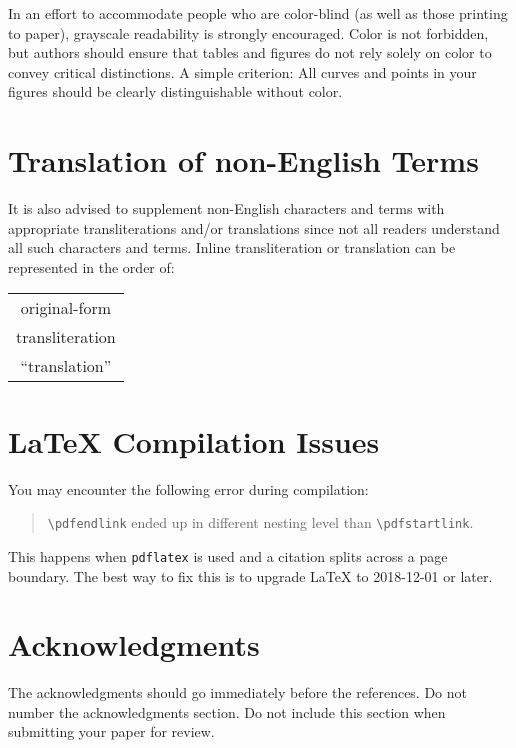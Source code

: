 \documentclass[11pt,a4paper]{article}
\begin{document}
In an effort to accommodate people who are color-blind (as well as those printing to paper), grayscale readability is strongly encouraged.
Color is not forbidden, but authors should ensure that tables and figures do not rely solely on color to convey critical distinctions.
A simple criterion:
All curves and points in your figures should be clearly distinguishable without color.

\section{Translation of non-English Terms}

It is also advised to supplement non-English characters and terms with appropriate transliterations and/or translations since not all readers understand all such characters and terms.
Inline transliteration or translation can be represented in the order of:
\begin{center}
\begin{tabular}{c}
original-form \\
transliteration \\
``translation''
\end{tabular}
\end{center}

\section{\LaTeX{} Compilation Issues}
You may encounter the following error during compilation: 
\begin{quote}
{\small\verb|\pdfendlink|} ended up in different nesting level than {\small\verb|\pdfstartlink|}.
\end{quote}
This happens when \texttt{\small pdflatex} is used and a citation splits across a page boundary. The best way to fix this is to upgrade \LaTeX{} to 2018-12-01 or later.

\section*{Acknowledgments}

The acknowledgments should go immediately before the references. Do not number the acknowledgments section.
Do not include this section when submitting your paper for review.

%



\appendix
\end{document}
